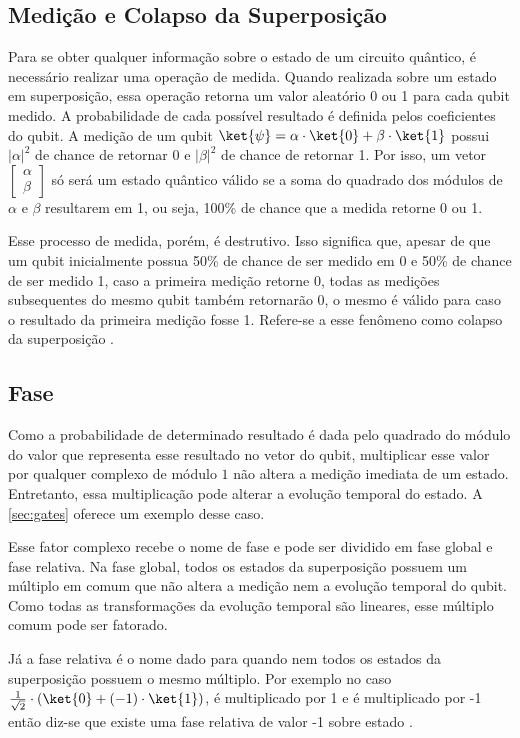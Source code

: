\subsection{Medição e Colapso da Superposição}\label{sub:result}

Para se obter qualquer informação sobre o estado de um circuito quântico, é necessário realizar uma operação de medida. Quando realizada sobre um estado em superposição, essa operação retorna um valor aleatório 0 ou 1 para cada qubit medido. A probabilidade de cada possível resultado é definida pelos coeficientes do qubit. A medição de um qubit $\ket{\psi} = \alpha \cdot \ket{0}+\beta \cdot \ket{1}$ possui $|\alpha|^2$ de chance de retornar 0 e $|\beta|^2$ de chance de retornar 1. Por isso, um vetor $\begin{bmatrix} \alpha \\ \beta \end{bmatrix}$ só será um estado quântico válido se a soma do quadrado dos módulos de $\alpha$ e $\beta$ resultarem em 1, ou seja, 100\% de chance que a medida retorne 0 ou 1.

Esse processo de medida, porém, é destrutivo. Isso significa que, apesar de que um qubit inicialmente possua 50\% de chance de ser medido em 0 e 50\% de chance de ser medido 1, caso a primeira medição retorne 0, todas as medições subsequentes do mesmo qubit também retornarão 0, o mesmo é válido para caso o resultado da primeira medição fosse 1. Refere-se a esse fenômeno como colapso da superposição \cite{griffiths1995introduction}.

\subsection{Fase}
Como a probabilidade de determinado resultado é dada pelo quadrado do módulo do valor que representa esse resultado no vetor do qubit, multiplicar esse valor por qualquer complexo de módulo $1$ não altera a medição imediata de um estado. Entretanto, essa multiplicação pode alterar a evolução temporal do estado. A \cref{sec:gates} oferece um exemplo desse caso.

Esse fator complexo recebe o nome de fase e pode ser dividido em fase global e fase relativa. Na fase global, todos os estados da superposição possuem um múltiplo em comum que não altera a medição nem a evolução temporal do qubit. Como todas as transformações da evolução temporal são lineares, esse múltiplo comum pode ser fatorado.

Já a fase relativa é o nome dado para quando nem todos os estados da superposição possuem o mesmo múltiplo. Por exemplo no caso $\frac{1}{\sqrt{2}}\cdot(\ket{0} + (-1)\cdot \ket{1})$,  é multiplicado por 1 e  é multiplicado por -1 então diz-se que existe uma fase relativa de valor -1 sobre estado .

